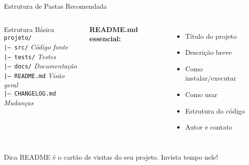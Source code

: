 \documentclass[10pt]{beamer}
\begin{document}
\begin{frame}{Estrutura de Pastas Recomendada}
\begin{columns}[c]
\begin{block}{Estrutura Básica}
\texttt{projeto/}\\
\texttt{|-- src/} \hfill \textit{Código fonte}\\
\texttt{|-- tests/} \hfill \textit{Testes}\\
\texttt{|-- docs/} \hfill \textit{Documentação}\\
\texttt{|-- README.md} \hfill \textit{Visão geral}\\
\texttt{|-- CHANGELOG.md} \hfill \textit{Mudanças}
\end{block}

\textbf{README.md essencial:}
\begin{itemize}
    \item Título do projeto
    \item Descrição breve
    \item Como instalar/executar
    \item Como usar
    \item Estrutura do código
    \item Autor e contato
\end{itemize}
\end{columns}

\vspace{0.3cm}
\begin{alertblock}{Dica}
README é o cartão de visitas do seu projeto. Invista tempo nele!
\end{alertblock}
\end{frame}
\end{document}

